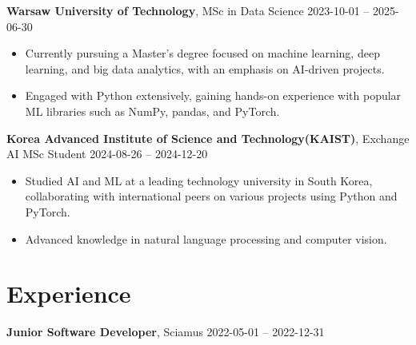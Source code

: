 \documentclass[10pt, letterpaper]{article}
\begin{document}
\begin{paracol}{2}
\noindent\textbf{Warsaw University of Technology}, MSc in Data Science \switchcolumn
\hfill 2023-10-01 -- 2025-06-30
\end{paracol}

\vspace{5pt}

\begin{itemize}
    
    \item Currently pursuing a Master's degree focused on machine learning, deep learning, and big data analytics, with an emphasis on AI-driven projects.
    
    \item Engaged with Python extensively, gaining hands-on experience with popular ML libraries such as NumPy, pandas, and PyTorch.
    
\end{itemize}

\begin{paracol}{2}
\noindent\textbf{Korea Advanced Institute of Science and Technology(KAIST)}, Exchange AI MSc Student \switchcolumn
\hfill 2024-08-26 -- 2024-12-20
\end{paracol}

\vspace{5pt}

\begin{itemize}
    
    \item Studied AI and ML at a leading technology university in South Korea, collaborating with international peers on various projects using Python and PyTorch.
    
    \item Advanced knowledge in natural language processing and computer vision.
    
\end{itemize}


\section*{Experience}

\begin{paracol}{2}
\noindent\textbf{Junior Software Developer}, Sciamus \switchcolumn
\hfill 2022-05-01 -- 2022-12-31
\end{paracol}

\vspace{5pt}
\end{document}
